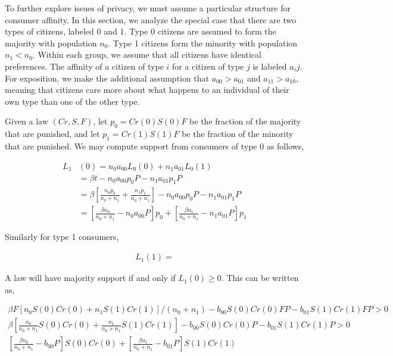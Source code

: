 To further explore issues of privacy, we must assume a particular structure for consumer affinity.  In this section, we analyze the special case that there are two types of citizens, labeled 0 and 1.  Type 0 citizens are assumed to form the majority with population $n_0$.  Type 1 citizens form the minority with population $n_1 < n_0$.  Within each group, we assume that all citizens have identical preferences.  The affinity of a citizen of type $i$ for a citizen of type $j$ is labeled $a_ij$.  For exposition, we make the additional assumption that $a_{00} > a_{01}$ and $a_{11} > a_{10}$, meaning that citizens care more about what happens to an individual of their own type than one of the other type.

Given a law $(Cr, S, F)$, let $p_0 = Cr(0)S(0)F$ be the fraction of the majority that are punished, and let $p_1 = Cr(1)S(1)F$ be the fraction of the minority that are punished.  We may compute support from consumers of type 0 as follows,

\begin{align}
L_1&(0) = n_0 a_{00}  L_0(0) + n_1 a_{01}  L_0(1) \\
&= \beta t - n_0 a_{00}p_0 P - n_1 a_{01}  p_1 P \\
&= \beta \left[ \frac{n_0 p_0}{n_0 + n_1}   + \frac{n_1 p_1}{n_0 + n_1} \right]  - n_0 a_{00}p_0 P - n_1 a_{01}  p_1 P \\
&= \left[  \frac{\beta n_0}{n_0 + n_1} - n_0 a_{00}P  \right]p_0 + \left[ \frac{\beta n_1}{n_0 + n_1} -  n_1 a_{01}P \right] p_1
\end{align}



Similarly for type 1 consumers,

\begin{align}
L_1(1) = 
\end{align}



A law will have majority support if and only if $L_1(0) \geq 0$.  This can be written as,

\begin{align}
\beta F\left[ n_0 S(0)Cr(0) + n_1 S(1)Cr(1)\right]/(n_0 + n_1)  - b_{00}S(0)Cr(0)FP - b_{01}  S(1)Cr(1)FP > 0 \\
\beta \left[ \frac{n_0}{n_0 + n_1}  S(0)Cr(0) + \frac{n_1}{n_0 + n_1} S(1)Cr(1)\right] - b_{00}S(0)Cr(0)P - b_{01}  S(1)Cr(1)P > 0 \\
[  \frac{\beta n_0}{n_0 + n_1} - b_{00}P  ]S(0)Cr(0) + [ \frac{\beta n_1}{n_0 + n_1} -  b_{01}P ] S(1)Cr(1) 
\end{align}

